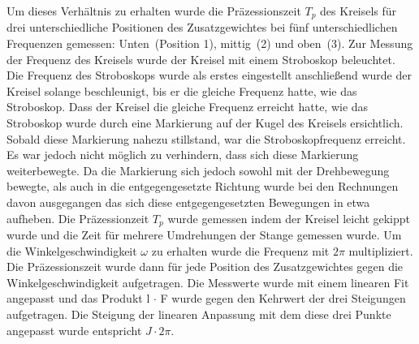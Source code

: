 Um dieses Verhältnis zu erhalten wurde die Präzessionszeit $T_p$ des Kreisels für drei unterschiedliche Positionen des Zusatzgewichtes bei fünf unterschiedlichen Frequenzen gemessen: Unten~(Position 1), mittig~(2) und oben~(3). Zur Messung der Frequenz des Kreisels wurde der Kreisel mit einem Stroboskop beleuchtet. Die Frequenz des Stroboskops wurde als erstes eingestellt anschließend wurde der Kreisel solange beschleunigt, bis er die gleiche Frequenz hatte, wie das Stroboskop.
Dass der Kreisel die gleiche Frequenz erreicht hatte, wie das Stroboskop wurde durch eine Markierung auf der Kugel des Kreisels ersichtlich. Sobald diese Markierung nahezu stillstand, war die Stroboskopfrequenz erreicht. Es war jedoch nicht möglich zu verhindern, dass sich diese Markierung weiterbewegte. Da die Markierung sich jedoch sowohl mit der Drehbewegung bewegte, als auch in die entgegengesetzte Richtung wurde bei den Rechnungen davon ausgegangen das sich diese entgegengesetzten Bewegungen in etwa aufheben. Die Präzessionzeit $T_p$ wurde gemessen indem der Kreisel leicht gekippt wurde und die Zeit für mehrere Umdrehungen der Stange gemessen wurde. Um die Winkelgeschwindigkeit $\omega$ zu erhalten wurde die Frequenz mit $2 \pi$ multipliziert.
Die Präzessionszeit wurde dann für jede Position des Zusatzgewichtes gegen die Winkelgeschwindigkeit aufgetragen. Die Messwerte wurde mit einem linearen Fit angepasst und das Produkt l $\cdot$ F wurde gegen den Kehrwert der drei Steigungen aufgetragen. Die Steigung der linearen Anpassung mit dem diese drei Punkte angepasst wurde entspricht $J \cdot 2 \pi$.